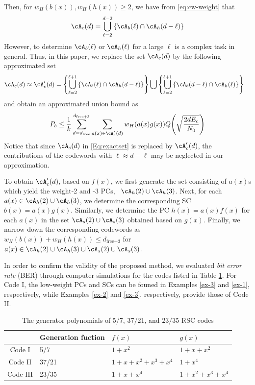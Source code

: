 Then, for $w_H(b(x)), w_H(h(x)) \geq 2$, we have from \eqref{eq:cw-weight} that
\begin{align}
\cA_c(d) = \bigcup_{\ell = 2}^{d-2} \left\{\cA_b(\ell) \cap \cA_h(d-\ell)\right\}
\label{Eq:exactset}
\end{align}
However, to determine $\cA_b(\ell)$ or $\cA_h(\ell)$ for a large $\ell$ is a complex task in general. Thus, in this paper, we replace the set $\cA_c(d)$ by the following approximated set %
\begin{equation}
\begin{split}
\cA_c(d) \approx \cA_c'(d) &= \left\{\bigcup_{\ell = 2}^{\ell+1} \left\{\cA_b(\ell) \cap \cA_h(d-\ell)\right\}\right\}\bigcup \left\{\bigcup_{\ell = 2}^{\ell+1} \left\{\cA_b(d-\ell) \cap \cA_h(\ell)\right\}\right\}
\end{split}
\label{setApprox}
\end{equation}
and obtain an approximated union bound as
\begin{align}
P_b \leq \frac{1}{k} \sum_{d=d_{\text{free}}}^{d_{\text{free}+3}} \sum_{a(x) \in \cA'_c(d)}w_H(a(x)g(x)) Q\Bigg( \sqrt{\frac{2dE_c}{N_0}}\Bigg)
\label{novelEq7}
\end{align}
Notice that since $\cA_c(d)$ in \eqref{Eq:exactset} is replaced by $\cA_c'(d)$, the contributions of the codewords with $\ell \approx d-\ell$ may be neglected in our approximation.

To obtain $\cA_c'(d)$, based on $f(x)$, we first generate the set consisting of $a(x)$s which yield the weight-2 and -3 PCs, \ie~$\cA_h(2)\cup\cA_h(3)$. Next, for each $a(x) \in \cA_h(2)\cup\cA_h(3)$, we determine the corresponding SC $b(x)=a(x)g(x)$. Similarly, we determine the PC $h(x)=a(x)f(x)$ for each $a(x)$ in the set $\cA_s(2)\cup\cA_s(3)$  obtained based on $g(x)$. Finally, we narrow down the corresponding codewords as $w_H(b(x))+w_H(h(x)) \leq d_{\text{free+3}}$ for $a(x) \in \cA_h(2)\cup\cA_h(3)\cup\cA_s(2)\cup\cA_s(3)$.

In order to confirm the validity of the proposed method, we evaluated {\it bit error rate} (BER) through computer simulations for the codes listed in Table \ref{TB:Codes}. For Code I, the low-weight PCs and SCs can be founed in Examples \ref{ex-3} and \ref{ex-1}, respectively, while Examples \ref{ex-2} and \ref{ex-3}, respectively, provide those of Code II.
\begin{table}[htbp]
	\caption{The generator polynomials of $5/7$, $37/21$, and $23/35$ RSC codes}
	\centering
	\begin{tabularx}{0.75\textwidth}{clll} 
		\toprule
			& Generation fuction & $f(x)$ & $g(x)$ \\ %
		\midrule
		Code I & 5/7 & $1+x^2$ & $1+x+x^2$\\
		Code II & 37/21 & $1+x+x^2+x^3+x^4$& $1+x^4$\\
		Code III & 23/35 & $1+x+x^4$& $1+x^2+x^3+x^4$\\
		\bottomrule
	\end{tabularx}
	\label{TB:Codes}
\end{table}






